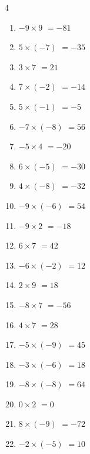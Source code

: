\begin{multicols}{4}
\begin{enumerate}
  \item $-9\times 9$
        $=-81$

\columnbreak %

  \item $5\times (-7)$
        $=-35$

  \item $3\times 7$
        $=21$

  \item $7\times (-2)$
        $=-14$

  \item $5\times (-1)$
        $=-5$

  \item $-7\times (-8)$
        $=56$

  \item $-5\times 4$
        $=-20$

  \item $6\times (-5)$
        $=-30$

  \item $4\times (-8)$
        $=-32$

  \item $-9\times (-6)$
        $=54$

  \item $-9\times 2$
        $=-18$

  \item $6\times 7$
        $=42$

  \item $-6\times (-2)$
        $=12$

  \item $2\times 9$
        $=18$

  \item $-8\times 7$
        $=-56$

  \item $4\times 7$
        $=28$

  \item $-5\times (-9)$
        $=45$

  \item $-3\times (-6)$
        $=18$

  \item $-8\times (-8)$
        $=64$

  \item $0\times 2$
        $=0$

  \item $8\times (-9)$
        $=-72$

  \item $-2\times (-5)$
        $=10$


\end{enumerate}
\end{multicols}
